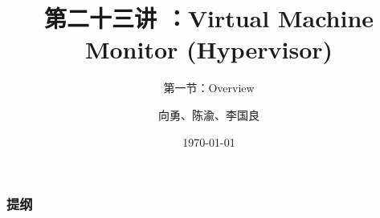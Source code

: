 


\title[第23讲]{第二十三讲 ：Virtual Machine Monitor (Hypervisor)} %
\subtitle{第一节：Overview }
\author{向勇、陈渝、李国良} %
\date{\today} %



\begin{frame}
\titlepage %
\end{frame}

%
%
\begin{frame}
\frametitle{提纲} %
\tableofcontents %
\end{frame}
